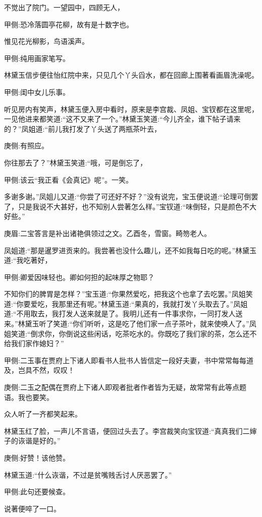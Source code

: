 \begin{parag}
    不觉出了院门。一望园中，四顾无人，\begin{note}甲侧:恐冷落圆亭花柳，故有是十数字也。\end{note}惟见花光柳影，鸟语溪声。\begin{note}甲侧:纯用画家笔写。\end{note}林黛玉信步便往怡红院中来，只见几个丫头舀水，都在回廊上围著看画眉洗澡呢。\begin{note}甲侧:闺中女儿乐事。\end{note}听见房内有笑声，林黛玉便入房中看时，原来是李宫裁、凤姐、宝钗都在这里呢，一见他进来都笑道:“这不又来了一个。”林黛玉笑道:“今儿齐全，谁下帖子请来的？”凤姐道:“前儿我打发了丫头送了两瓶茶叶去，\begin{note}庚侧:有照应。\end{note}你往那去了？”林黛玉笑道:“哦，可是倒忘了，\begin{note}甲侧:该云“我正看《会真记》呢”。一笑。\end{note}多谢多谢。”凤姐儿又道:“你尝了可还好不好？”没有说完，宝玉便说道:“论理可倒罢了，只是我说不大甚好，也不知别人尝著怎么样。”宝钗道:“味倒轻，只是颜色不大好些。”\begin{note}庚眉:二宝答言是补出诸艳俱领过之文。乙酉冬，雪窗。畸笏老人。\end{note}凤姐道:“那是暹罗进贡来的。我尝著也没什么趣儿，还不如我每日吃的呢。”林黛玉道:“我吃著好，\begin{note}甲侧:卿爱因味轻也。卿如何担的起味厚之物耶？\end{note}不知你们的脾胃是怎样？”宝玉道:“你果然爱吃，把我这个也拿了去吃罢。”凤姐笑道:“你要爱吃，我那里还有呢。”林黛玉道:“果真的，我就打发丫头取去了。”凤姐道:“不用取去，我打发人送来就是了。我明儿还有一件事求你，一同打发人送来。”林黛玉听了笑道:“你们听听，这是吃了他们家一点子茶叶，就来使唤人了。”凤姐笑道:“倒求你，你倒说这些闲话，吃茶吃水的。你既吃了我们家的茶，怎么还不给我们家作媳妇？”\begin{note}甲侧:二玉事在贾府上下诸人即看书人批书人皆信定一段好夫妻，书中常常每每道及，岂具不然，叹叹！\end{note}\begin{note}庚侧:二玉之配偶在贾府上下诸人即观者批者作者皆为无疑，故常常有此等点题语。我也要笑。\end{note}众人听了一齐都笑起来。
\end{parag}


\begin{parag}
    林黛玉红了脸，一声儿不言语，便回过头去了。李宫裁笑向宝钗道:“真真我们二婶子的诙谐是好的。”\begin{note}庚侧:好赞！该他赞。\end{note}林黛玉道:“什么诙谐，不过是贫嘴贱舌讨人厌恶罢了。”\begin{note}甲侧:此句还要候查。\end{note}说著便啐了一口。
\end{parag}


